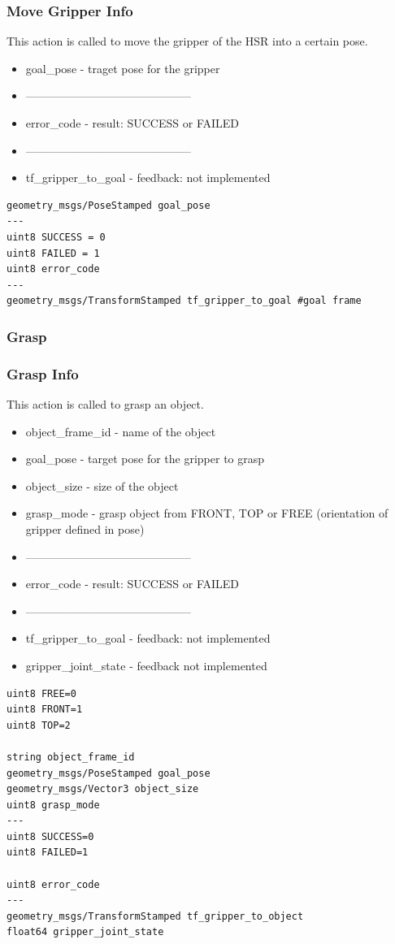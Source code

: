 \documentclass[main.tex]{subfiles}
\begin{document}
				\subsubsection{Move Gripper Info}
				This action is called to move the gripper of the HSR into a certain pose.
				\begin{itemize}
					\item goal\_pose - traget pose for the gripper
					\item --------------------------------------------
					\item error\_code - result: SUCCESS or FAILED
					\item --------------------------------------------
					\item tf\_gripper\_to\_goal - feedback: not implemented
				\end{itemize}
					\begin{lstlisting}
geometry_msgs/PoseStamped goal_pose
---
uint8 SUCCESS = 0
uint8 FAILED = 1
uint8 error_code
---
geometry_msgs/TransformStamped tf_gripper_to_goal #goal frame
\end{lstlisting}
				\subsubsection{Grasp}
				\label{msg_grasp}
				\subsubsection{Grasp Info}
				This action is called to grasp an object.
				\begin{itemize}
					\item object\_frame\_id - name of the object
					\item goal\_pose - target pose for the gripper to grasp
					\item object\_size - size of the object
					\item grasp\_mode - grasp object from FRONT, TOP or FREE (orientation of gripper defined in pose)
					\item --------------------------------------------
					\item error\_code - result: SUCCESS or FAILED
					\item --------------------------------------------
					\item tf\_gripper\_to\_goal - feedback: not implemented
					\item gripper\_joint\_state - feedback not implemented
				\end{itemize}
					\begin{lstlisting}
uint8 FREE=0
uint8 FRONT=1
uint8 TOP=2
		
string object_frame_id
geometry_msgs/PoseStamped goal_pose 
geometry_msgs/Vector3 object_size
uint8 grasp_mode
---
uint8 SUCCESS=0
uint8 FAILED=1
		
uint8 error_code
---
geometry_msgs/TransformStamped tf_gripper_to_object
float64 gripper_joint_state\end{lstlisting}
\end{document}
